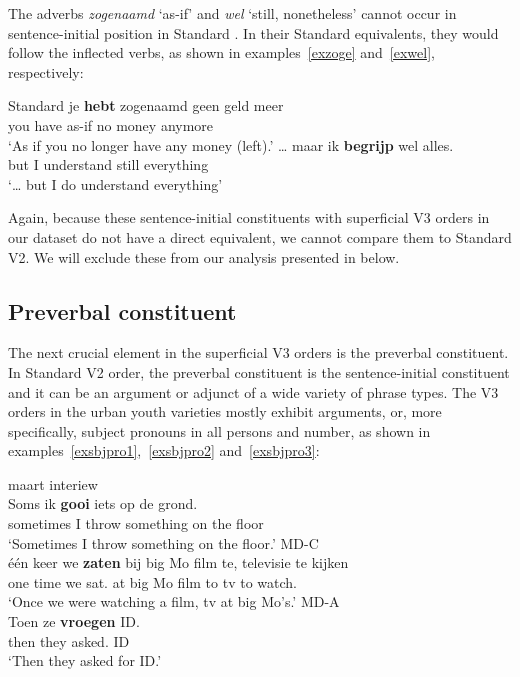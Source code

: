 \documentclass[output=paper]{langsci/langscibook}
\begin{document}
\noindent The adverbs \emph{zogenaamd} `as-if' and \emph{wel} `still,
nonetheless' cannot occur in sentence-initial position in Standard . In
their Standard  equivalents, they would follow the inflected verbs, as
shown in examples~\eqref{exzoge} and~\eqref{exwel}, respectively:

\ea Standard 
    \ea
    \gll\label{exzoge}je \textbf{hebt} zogenaamd geen geld meer\\
    you have as-if no money anymore\\
    \trans \enquote*{As if you no longer have any money (left).}
    \ex
    \gll\label{exwel}\dots{} maar ik \textbf{begrijp} wel alles.\\
    {} but I understand still everything\\
    \trans \enquote*{\dots{} but I do understand everything}
    \z
\z

\noindent Again, because these sentence-initial constituents with superficial
V3 orders in our dataset do not have a direct equivalent, we cannot compare
them to Standard  V2. We will exclude these from our analysis presented in
 below.

\subsection{Preverbal constituent}
\label{sec:dataprev}

\noindent The next crucial element in the superficial V3 orders is the
preverbal constituent. In Standard  V2 order, the preverbal constituent is
the sentence-initial constituent and it can be an argument or adjunct of a wide
variety of phrase types. The V3 orders in the  urban youth varieties
mostly exhibit arguments, or, more specifically, subject pronouns in all
persons and number, as shown in examples~\eqref{exsbjpro1},~\eqref{exsbjpro2}
and~\eqref{exsbjpro3}:

\ea
     maart interiew\\
    \gll\label{exsbjpro1}Soms ik \textbf{gooi} iets op de grond.\\
    sometimes I throw something on the floor\\
    \trans \enquote*{Sometimes I throw something on the floor.}
    \ex MD-C\\
    \gll\label{exsbjpro2}\'e\'en keer we \textbf{zaten} bij big Mo film te, televisie te kijken\\
    one time we sat.\Pl{} at big Mo film to tv to watch.\Inf{}\\
    \trans \enquote*{Once we were watching a film, tv at big Mo}s.'
    \ex MD-A\\
    \gll\label{exsbjpro3}Toen ze \textbf{vroegen} ID.\\
    then they asked.\Pl{} ID\\
    \trans \enquote*{Then they asked for ID.}
    \z
\z
\end{document}
